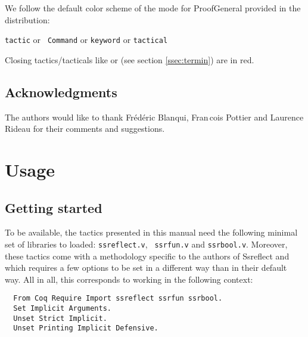 \ifhevea \else
\noindent We follow the default color scheme of the \ssr{} mode for
ProofGeneral provided in the distribution:

\centerline{
\textcolor{dkblue}{\texttt{tactic}} or \textcolor{dkviolet}{\tt
  Command} or \textcolor{dkgreen}{\tt keyword} or
\textcolor{dkpink}{\tt tactical}}

\noindent Closing tactics/tacticals like  or  (see section
\ref{ssec:termin}) are in red.
\fi

\subsection*{Acknowledgments}
The authors would like to thank Fr\'ed\'eric Blanqui, Fran\,cois Pottier
and Laurence Rideau for their comments and suggestions.

\newpage\section{Usage}

\subsection{Getting started}\label{sec:files}
To be available, the tactics presented in this manual need the
following minimal set of libraries to loaded: {\tt ssreflect.v}, {\tt
ssrfun.v} and {\tt ssrbool.v}. Moreover, these tactics come with a
methodology specific to the authors of Ssreflect and which requires a
few options to be set in a different way than in their default
way. All in all, this corresponds to working in the following context:

\begin{lstlisting}
  From Coq Require Import ssreflect ssrfun ssrbool.
  Set Implicit Arguments.
  Unset Strict Implicit.
  Unset Printing Implicit Defensive.
\end{lstlisting}

